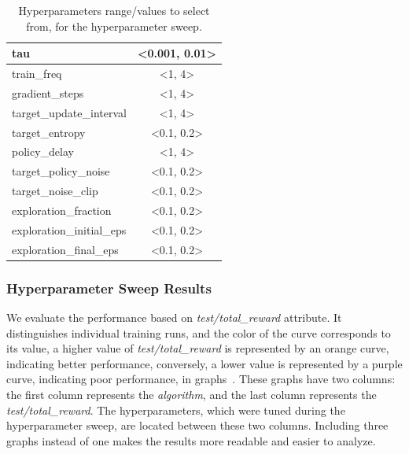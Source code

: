 \documentclass[../xlapes02]{subfiles}
\begin{document}
\begin{table}[h!]
{\begin{tabular}{|l|c|}
                tau                       & <0.001, 0.01>                                   \\ \hline
                train\_freq               & <1, 4>                                          \\ \hline
                gradient\_steps           & <1, 4>                                          \\ \hline
                target\_update\_interval  & <1, 4>                                          \\ \hline
                target\_entropy           & <0.1, 0.2>                                      \\ \hline
                policy\_delay             & <1, 4>                                          \\ \hline
                target\_policy\_noise     & <0.1, 0.2>                                      \\ \hline
                target\_noise\_clip       & <0.1, 0.2>                                      \\ \hline
                exploration\_fraction     & <0.1, 0.2>                                      \\ \hline
                exploration\_initial\_eps & <0.1, 0.2>                                      \\ \hline
                exploration\_final\_eps   & <0.1, 0.2>                                      \\ \hline
            \end{tabular}
        }
        \caption{Hyperparameters range/values to select from, for the hyperparameter sweep.}
        \label{tab:hyperparameters}
    \end{table}

    \subsubsection{Hyperparameter Sweep Results}\label{subsubsec:hyperparameter_sweep_results}
    We evaluate the performance based on \emph{test/total\_reward} attribute. It distinguishes individual training runs, and the color of the curve corresponds to its value, a higher value of \emph{test/total\_reward} is represented by an \textcolor[RGB]{255,128,0}{orange curve, indicating better performance}, conversely, a lower value is represented by a \textcolor[RGB]{100,0,200}{purple curve, indicating poor performance}, in graphs~. These graphs have two columns: the first column represents the \emph{algorithm}, and the last column represents the \emph{test/total\_reward}. The hyperparameters, which were tuned during the hyperparameter sweep, are located between these two columns. Including three graphs instead of one makes the results more readable and easier to analyze.
\end{document}
